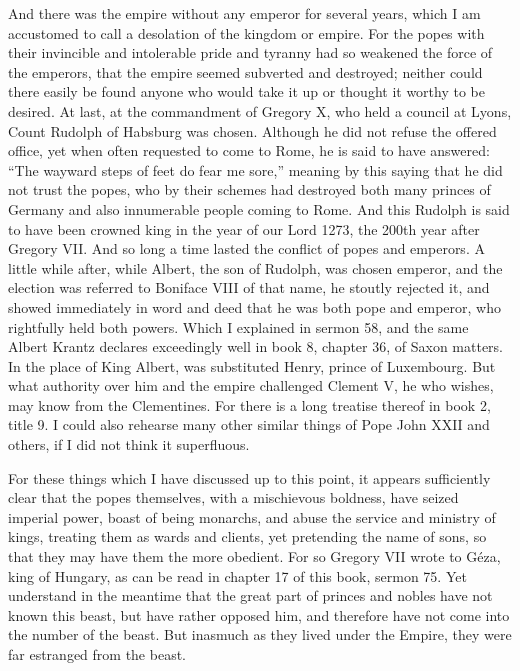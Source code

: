 And there was the empire without any emperor for several years, which I am accustomed to call a desolation of the kingdom or empire. For the popes with their invincible and intolerable pride and tyranny had so weakened the force of the emperors, that the empire seemed subverted and destroyed; neither could there easily be found anyone who would take it up or thought it worthy to be desired. At last, at the commandment of Gregory X, who held a council at Lyons, Count Rudolph of Habsburg was chosen. Although he did not refuse the offered office, yet when often requested to come to Rome, he is said to have answered: “The wayward steps of feet do fear me sore,” meaning by this saying that he did not trust the popes, who by their schemes had destroyed both many princes of Germany and also innumerable people coming to Rome. And this Rudolph is said to have been crowned king in the year of our Lord 1273, the 200th year after Gregory VII. And so long a time lasted the conflict of popes and emperors. A little while after, while Albert, the son of Rudolph, was chosen emperor, and the election was referred to Boniface VIII of that name, he stoutly rejected it, and showed immediately in word and deed that he was both pope and emperor, who rightfully held both powers. Which I explained in sermon 58, and the same Albert Krantz declares exceedingly well in book 8, chapter 36, of Saxon matters. In the place of King Albert, was substituted Henry, prince of Luxembourg. But what authority over him and the empire challenged Clement V, he who wishes, may know from the Clementines. For there is a long treatise thereof in book 2, title 9. I could also rehearse many other similar things of Pope John XXII and others, if I did not think it superfluous.

For these things which I have discussed up to this point, it appears sufficiently clear that the popes themselves, with a mischievous boldness, have seized imperial power, boast of being monarchs, and abuse the service and ministry of kings, treating them as wards and clients, yet pretending the name of sons, so that they may have them the more obedient. For so Gregory VII wrote to Géza, king of Hungary, as can be read in chapter 17 of this book, sermon 75. Yet understand in the meantime that the great part of princes and nobles have not known this beast, but have rather opposed him, and therefore have not come into the number of the beast. But inasmuch as they lived under the Empire, they were far estranged from the beast.

